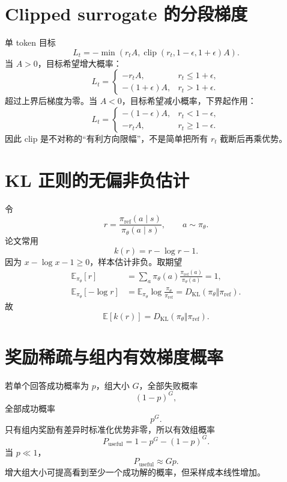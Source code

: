 \documentclass[UTF8,12pt,a4paper,fontset=none]{ctexart}
\numberwithin{equation}{section}
\newcommand{\E}{\mathbb{E}}
\newcommand{\KL}{D_{\mathrm{KL}}}
\begin{document}
\section{Clipped surrogate 的分段梯度}
单 token 目标
\begin{equation}
 L_t=-\min(r_tA,\operatorname{clip}(r_t,1-\epsilon,1+\epsilon)A).
\end{equation}
当 $A>0$，目标希望增大概率：
\begin{equation}
 L_t=
 \begin{cases}
 -r_tA,&r_t\le1+\epsilon,\\
 -(1+\epsilon)A,&r_t>1+\epsilon.
 \end{cases}
\end{equation}
超过上界后梯度为零。当 $A<0$，目标希望减小概率，下界起作用：
\begin{equation}
 L_t=
 \begin{cases}
 -(1-\epsilon)A,&r_t<1-\epsilon,\\
 -r_tA,&r_t\ge1-\epsilon.
 \end{cases}
\end{equation}
因此 clip 是不对称的“有利方向限幅”，不是简单把所有 $r_t$ 截断后再乘优势。

\section{KL 正则的无偏非负估计}
令
\begin{equation}
 r=\frac{\pi_{\mathrm{ref}}(a\mid s)}{\pi_\theta(a\mid s)},
 \qquad a\sim\pi_\theta.
\end{equation}
论文常用
\begin{equation}
 k(r)=r-\log r-1.
\end{equation}
因为 $x-\log x-1\ge0$，样本估计非负。取期望
\begin{align}
 \E_{\pi_\theta}[r]&=\sum_a\pi_\theta(a)\frac{\pi_{\mathrm{ref}}(a)}{\pi_\theta(a)}=1,\\
 \E_{\pi_\theta}[-\log r]
 &=\E_{\pi_\theta}\log\frac{\pi_\theta}{\pi_{\mathrm{ref}}}
 =\KL(\pi_\theta\Vert\pi_{\mathrm{ref}}).
\end{align}
故
\begin{equation}
 \E[k(r)]=\KL(\pi_\theta\Vert\pi_{\mathrm{ref}}).
\end{equation}

\section{奖励稀疏与组内有效梯度概率}
若单个回答成功概率为 $p$，组大小 $G$，全部失败概率
\begin{equation}
 (1-p)^G,
\end{equation}
全部成功概率
\begin{equation}
 p^G.
\end{equation}
只有组内奖励有差异时标准化优势非零，所以有效组概率
\begin{equation}
 \boxed{P_{\mathrm{useful}}=1-p^G-(1-p)^G.}
\end{equation}
当 $p\ll1$，
\begin{equation}
 P_{\mathrm{useful}}\approx Gp.
\end{equation}
增大组大小可提高看到至少一个成功解的概率，但采样成本线性增加。
\end{document}
